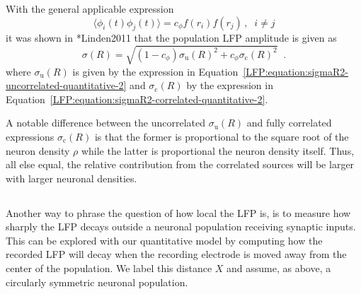 With the general applicable expression
\begin{equation}
\langle \phi_i(t) \phi_j(t) \rangle= c_\phi f(r_i) f(r_j)\, , \;\; i \neq j
\label{LFP:box:equation:phii-phij}
\end{equation}
it was shown in \citeasnoun**{Linden2011} that the population LFP amplitude is given as
\begin{equation}
  \sigma(R)=\sqrt{(1-c_\phi) \sigma_\text{u}(R)^2 +  c_\phi \sigma_\text{c}(R)^2}\;\;.
  \label{LFP:box:equation:sigmaR}
\end{equation}
where $\sigma_\text{u}(R)$ is given by the expression in Equation~\ref{LFP:equation:sigmaR2-uncorrelated-quantitative-2} and
 $\sigma_\text{c}(R)$ by the expression in Equation~\ref{LFP:equation:sigmaR2-correlated-quantitative-2}.

A notable difference between the uncorrelated $\sigma_\text{u}(R)$ and fully correlated expressions $\sigma_\text{c}(R)$ is that 
the former is proportional to the square root of the neuron density $\rho$ while the latter is proportional the neuron density itself.
Thus, all else equal, the relative contribution from the correlated sources will be larger with larger neuronal densities. 


\subsection{}

Another way to phrase the question of how local the LFP is, is to measure how sharply the LFP decays outside a neuronal population receiving synaptic inputs.
This can be explored with our quantitative model by computing how the recorded LFP will decay when the recording electrode is moved away from the center of 
the population. We label this distance $X$ and assume, as above, a circularly symmetric neuronal population. 

